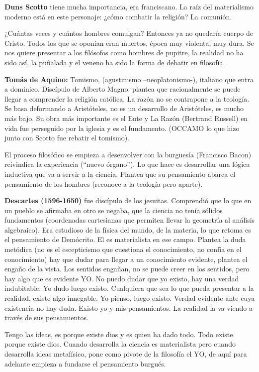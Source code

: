 \documentclass[
  a4paper,
]{article}
\begin{document}
\textbf{Duns Scotto} tiene mucha importancia, era franciscano. La raíz
del materialismo moderno está en este personaje: ¿cómo combatir la
religión? La comunión.

¿Cuántas veces y cuántos hombres comulgan? Entonces ya no quedaría
cuerpo de Cristo. Todos los que se oponían eran muertos, época muy
violenta, muy dura. Se nos quiere presentar a los filósofos como hombres
de pupitre, la realidad no ha sido así, la puñalada y el veneno ha sido
la forma de debatir en filosofía.

\textbf{Tomás de Aquino:} Tomismo, (agustinismo --neoplatonismo-),
italiano que entra a dominico. Discípulo de Alberto Magno: plantea que
racionalmente se puede llegar a comprender la religión católica. La
razón no se contrapone a la teología. Se basa deformando a Aristóteles,
no es un desarrollo de Aristóteles, es mucho más bajo. Su obra más
importante es el Ente y La Razón (Bertrand Russell) en vida fue
perseguido por la iglesia y es el fundamento. (OCCAMO lo que hizo junto
con Scotto fue rebatir el tomismo).

El proceso filosófico se empieza a desenvolver con la burguesía
(Francisco Bacon) reivindica la experiencia (``nuevo órgano''). Lo que
hace es desarrollar una lógica inductiva que va a servir a la ciencia.
Plantea que su pensamiento abarca el pensamiento de los hombres
(reconoce a la teología pero aparte).

\textbf{Descartes (1596-1650)} fue discípulo de los jesuitas. Comprendió
que lo que en un pueblo se afirmaba en otro se negaba, que la ciencia no
tenía sólidos fundamentos (coordenadas cartesianas que permiten llevar
la geometría al análisis algebraico). Era estudioso de la física del
mundo, de la materia, lo que retoma es el pensamiento de Demócrito. El
es materialista en ese campo. Plantea la duda metódica (no es el
escepticismo que cuestiona el conocimiento, no confía en el
conocimiento) hay que dudar para llegar a un conocimiento evidente,
plantea el engaño de la vista. Los sentidos engañan, no se puede creer
en los sentidos, pero hay algo que es evidente YO. No puedo dudar que yo
existo, hay una verdad indubitable. Yo dudo luego existo. Cualquiera que
sea lo que pueda presentar a la realidad, existe algo innegable. Yo
pienso, luego existo. Verdad evidente ante cuya existencia no hay duda.
Existo yo y mis pensamientos. La realidad la va viendo a través de sus
pensamientos.

Tengo las ideas, es porque existe dios y es quien ha dado todo. Todo
existe porque existe dios. Cuando desarrolla la ciencia es materialista
pero cuando desarrolla ideas metafísico, pone como pivote de la
filosofía el YO, de aquí para adelante empieza a fundarse el pensamiento
burgués.
\end{document}
